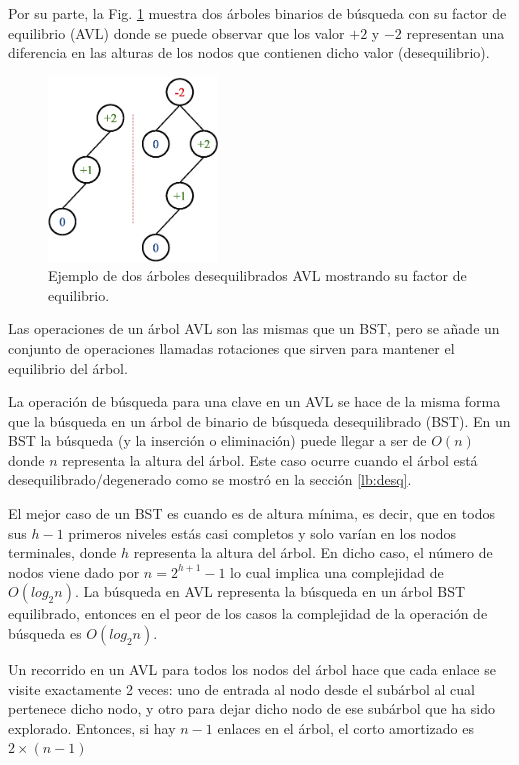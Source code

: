 Por su parte, la Fig. \ref{fig:AVLExample2} muestra dos árboles binarios de búsqueda con su factor de equilibrio (AVL) donde se puede observar que los valor $+2$ y $-2$ representan una diferencia en las alturas de los nodos que contienen dicho valor (desequilibrio).

\begin{figure}[htpb!]
  \begin{center}
    \includegraphics[width=0.4\textwidth]{images/AVLExample2.eps}
  \end{center}
  \caption{Ejemplo de dos árboles desequilibrados AVL mostrando su factor de equilibrio.}
  \label{fig:AVLExample2}
\end{figure}

Las operaciones de un árbol AVL son las mismas que un BST, pero se añade un conjunto de operaciones llamadas rotaciones que sirven para mantener el equilibrio del árbol.

La operación de búsqueda para una clave en un AVL se hace de la misma forma que la búsqueda en un árbol de binario de búsqueda desequilibrado (BST). En un BST la búsqueda (y la inserción o eliminación) puede llegar a ser de $O(n)$ donde $n$ representa la altura del árbol. Este caso ocurre cuando el árbol está desequilibrado/degenerado como se mostró en la sección \ref{lb:desq}.

El mejor caso de un BST es cuando es de altura mínima, es decir, que en todos sus $h-1$ primeros niveles estás casi completos y solo varían en los nodos terminales, donde $h$ representa la altura del árbol. En dicho caso, el número de nodos viene dado por $n = 2^{h+1}-1$ lo cual implica una complejidad de $O(log_2n)$. La búsqueda en AVL representa la búsqueda en un árbol BST equilibrado, entonces en el peor de los casos la complejidad de la operación de búsqueda es $O(log_2n)$.

Un recorrido en un AVL para todos los nodos del árbol hace que cada enlace se visite exactamente 2 veces: uno de entrada al nodo desde el subárbol al cual pertenece dicho nodo, y otro para dejar dicho nodo de ese subárbol que ha sido explorado. Entonces, si hay $n-1$ enlaces en el árbol, el corto amortizado es $2 \times (n-1)$


